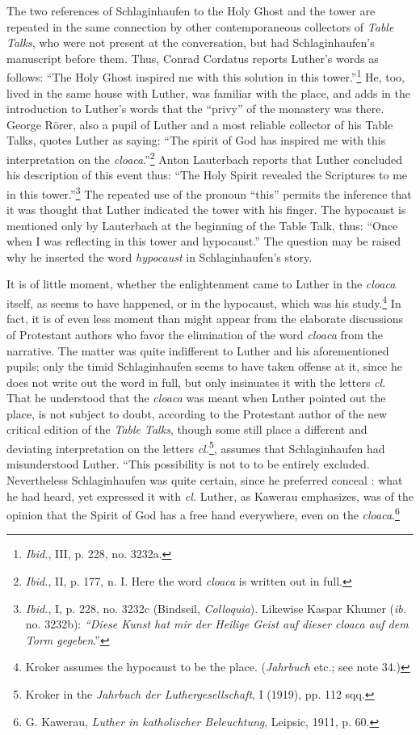 The two references of Schlaginhaufen to the Holy Ghost and the
tower are repeated in the same connection by other contemporaneous
collectors of \textit{Table Talks}, who were not present at the conversation,
but had Schlaginhaufen’s manuscript before them. Thus, Conrad
Cordatus reports Luther’s words as follows: “The Holy Ghost inspired
me with this solution in this tower.”\footnote{\textit{Ibid.}, III, p. 228, no. 3232a.}
He, too, lived in the same house
with Luther, was familiar with the place, and adds in the introduction
to Luther’s words that the “privy” of the monastery was there. George
Rörer, also a pupil of Luther and a most reliable collector of his Table
Talks, quotes Luther as saying: “The spirit of God has inspired me
with this interpretation on the \textit{cloaca}.”\footnote
{\textit{Ibid.}, II, p. 177, n. I. Here the word \textit{cloaca} is written out in full.}
Anton Lauterbach reports
that Luther concluded his description of this event thus: “The Holy
Spirit revealed the Scriptures to me in this tower.”\footnote
{\textit{Ibid.}, I, p. 228, no. 3232c (Bindseil, \textit{Colloquia}). Likewise Kaspar Khumer (\textit{ib.} no.
3232b): \textit{“Diese Kunst hat mir der Heilige Geist auf dieser cloaca auf dem Torm gegeben}.”}
The repeated
use of the pronoun “this” permits the inference that it was thought
that Luther indicated the tower with his finger. The hypocaust is
mentioned only by Lauterbach at the beginning of the Table Talk,
thus: “Once when I was reflecting in this tower and hypocaust.” The
question may be raised why he inserted the word \textit{hypocaust} in
Schlaginhaufen’s story.

It is of little moment, whether the enlightenment came to Luther
in the \textit{cloaca} itself, as seems to have happened, or in the hypocaust,
which was his study.\footnote{Kroker assumes the hypocaust to be the place. (\textit{Jahrbuch} etc.; see note 34.)}
In fact, it is of even less moment than might
appear from the elaborate discussions of Protestant authors who
favor the elimination of the word \textit{cloaca} from the narrative. The
matter was quite indifferent to Luther and his aforementioned pupils; only
the timid Schlaginhaufen seems to have taken offense at it,
since he does not write out the word in full, but only insinuates it with
the letters \textit{cl.} That he understood that the \textit{cloaca} was meant when
Luther pointed out the place, is not subject to doubt, according to the
Protestant author of the new critical edition of the \textit{Table Talks},
though some still place a different and deviating interpretation on
the letters \textit{cl.}\footnote{Kroker in the \textit{Jahrbuch der Luthergesellschaft}, I (1919), pp. 112 sqq.}, assumes that
Schlaginhaufen had misunderstood Luther. “This possibility is not to to be entirely excluded.
Nevertheless Schlaginhaufen was quite certain, since he preferred conceal : what he had
heard, yet expressed it with \textit{cl.}
Luther, as Kawerau emphasizes, was of the opinion
that the Spirit of God has a free hand everywhere, even on the
\textit{cloaca}.\footnote{G. Kawerau, \textit{Luther in katholischer Beleuchtung}, Leipsic, 1911, p. 60.}

